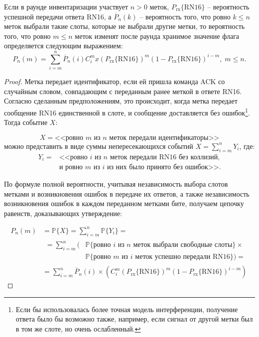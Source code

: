 \begin{prop}\label{prop:ch3_pnm}
	Если в раунде инвентаризации участвует $n > 0$ меток, $P_\text{rx}\{\text{RN16}\}$ -- вероятность успешной передачи ответа RN16, а $\overline{P}_n(k)$ -- вероятность того, что ровно $k \leqslant n$ меток выбрали такие слоты, которые не выбрали другие метки, то вероятность того, что ровно $m \leqslant n$ меток изменят после раунда хранимое значение флага определяется следующим выражением:
	\begin{equation}\label{eq:ch3_pnm}
		P_n(m) = \sum\limits_{i=m}^{n}\overline{P}_n(i) C_i^mx \left(P_\text{rx}\{\text{RN16}\}\right)^m
			\left(1 - P_\text{rx}\{\text{RN16}\}\right)^{i - m},\; m \leqslant n.
	\end{equation}
\end{prop}
\begin{proof}
	Метка передает идентификатор, если ей пришла команда ACK со случайным словом, совпадающим с переданным ранее меткой в ответе RN16. Согласно сделанным предположениям, это происходит, когда метка передает сообщение RN16 единственной в слоте, и сообщение доставляется без ошибок\footnote{Если бы использовалась более точная модель интерференции, получение ответа было бы возможно также, например, если сигнал от другой метки был в том же слоте, но очень ослабленный.}. Тогда событие $X$:

	$$
	X = \text{<<ровно $m$ из $n$ меток передали идентификаторы>>}
	$$
	можно представить в виде суммы непересекающихся событий $X = \sum\limits_{i=m}^n Y_i$, где:
	$$
	\begin{aligned}
	Y_i = &\text{<<ровно $i$ из $n$ меток передали RN16 без коллизий,}\\
		  &\text{и ровно $m$ из $i$ из них было принято без ошибок>>}.
	\end{aligned}
	$$

	По формуле полной вероятности, учитывая независимость выбора слотов метками и возникновения ошибок в передаче их ответов, а также независимость возникновения ошибок в каждом переданном метками бите, получаем цепочку равенств, доказывающих утверждение:

	\begin{align*}
		P_n(m) &= \mathbb{P}\{X\} = \sum\limits_{i=m}^{n} \mathbb{P}\{Y_i\} =\\
		&\begin{aligned}= \sum\limits_{i=m}^{n}(
			&\mathbb{P}\{\text{ровно $i$ из $n$ меток выбрали свободные слоты}\} \times\\
			& \mathbb{P}\{\text{ровно $m$ из $i$ меток успешно передали RN16}\}) =
			\end{aligned}\\
		&=\sum\limits_{i=m}^{n} \overline{P}_n(i) \times \left(C_i^m(P_\text{rx}\{\text{RN16}\})^m
			(1 - P_\text{rx}\{\text{RN16}\})^{i - m}\right)
	\end{align*}

\end{proof}

